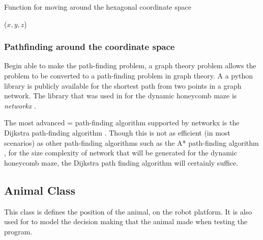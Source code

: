 \begin{algorithm}
\caption{Function for moving around the hexagonal coordinate space}
\require ($x, y, z$)
\end{algorithm}

\subsubsection{Pathfinding around the coordinate space}

Begin able to make the path-finding problem, a graph theory problem allows the problem to be converted to a path-finding problem in graph theory. A a python library is publicly available for the shortest path from two points in a graph network. The library that was used in for the dynamic honeycomb maze is \textit{networkx} \cite{networkx}.

The most advanced = path-finding algorithm supported by networkx is the Dijkstra path-finding algorithm \cite{dijkstra1959pathfinding}. Though this is not as efficient (in most scenarios) as other path-finding algorithms such as the A*  path-finding algorithm \cite{A*_pathfinding}, for the size complexity of network that will be generated for the dynamic honeycomb maze, the Dijkstra path finding algorithm will certainly suffice.



\subsection{Animal Class}

This class is defines the position of the animal, on the robot platform. It is also used for to model the decision making that the animal made when testing the program.


